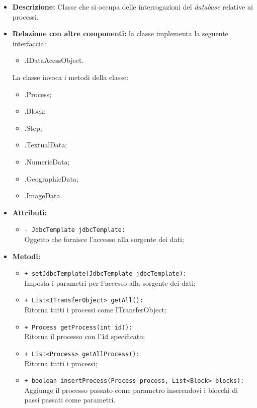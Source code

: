 \begin{flushleft}
\begin{itemize}
\item \textbf{Descrizione:} Classe che si occupa delle interrogazioni del \textit{database} relative ai processi.
\item \textbf{Relazione con altre componenti:} la classe implementa la seguente interfaccia:
		\begin{itemize}
			\item \smodel{}.IDataAcessObject.
		\end{itemize}
		La classe invoca i metodi della classe:
		\begin{itemize}
			\item \smodel{}.Process;
			\item \smodel{}.Block;
			\item \smodel{}.Step;
			\item \smodel{}.TextualData;
			\item \smodel{}.NumericData;
			\item \smodel{}.GeographicData;
			\item \smodel{}.ImageData.
		\end{itemize}\item \textbf{Attributi:}
\begin{sloppypar}
\begin{itemize}
\item \texttt{- JdbcTemplate jdbcTemplate:}\\ Oggetto che fornisce l'accesso alla sorgente dei dati;
\end{itemize}
\end{sloppypar}
\item \textbf{Metodi:}
\begin{sloppypar}
\begin{itemize}
\item \texttt{+ setJdbcTemplate(JdbcTemplate jdbcTemplate):}\\ Imposta i parametri per l'accesso alla sorgente dei dati;
\item \texttt{+ List<ITransferObject> getAll():}\\ Ritorna tutti i processi come ITransferObject; 
\item \texttt{+ Process getProcess(int id)):}\\ Ritorna il processo con l'\texttt{id} specificato; 
\item \texttt{+ List<Process> getAllProcess():}\\ Ritorna tutti i processi;
\item \texttt{+ boolean insertProcess(Process process, List<Block> blocks):}\\ Aggiunge il processo passato come parametro inserendovi i blocchi di passi passati come parametri.

\end{itemize}
\end{sloppypar}
\end{itemize}
\end{flushleft}
